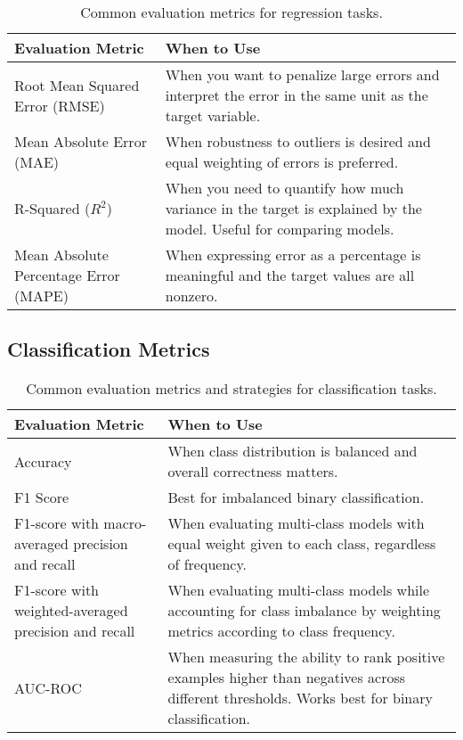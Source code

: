 \documentclass[12pt,openany, draft]{book}
\begin{document}
\begin{table}[H]
    \centering
    \small
    \renewcommand{\arraystretch}{1.3}
    \begin{tabular}{|l|p{9cm}|}
        \hline
        \textbf{Evaluation Metric} & \textbf{When to Use} \\
        \hline
        Root Mean Squared Error (RMSE) & When you want to penalize large errors and interpret the error in the same unit as the target variable. \\
        \hline
        Mean Absolute Error (MAE) & When robustness to outliers is desired and equal weighting of errors is preferred. \\
        \hline
        R-Squared (\( R^2 \)) & When you need to quantify how much variance in the target is explained by the model. Useful for comparing models. \\
        \hline
        Mean Absolute Percentage Error (MAPE) & When expressing error as a percentage is meaningful and the target values are all nonzero. \\
        \hline
    \end{tabular}
    \caption{Common evaluation metrics for regression tasks.}
\end{table}

\subsection{Classification Metrics}

\begin{table}[H]
    \centering
    \small
    \renewcommand{\arraystretch}{1.3}
    \begin{tabular}{|l|p{9cm}|}
        \hline
        \textbf{Evaluation Metric} & \textbf{When to Use} \\
        \hline
        Accuracy & When class distribution is balanced and overall correctness matters. \\
        \hline
        F1 Score & Best for 
        imbalanced binary classification. \\
        \hline
        F1-score with macro-averaged precision and recall & When evaluating multi-class models with equal weight 
        given to each class, regardless of frequency. \\
        \hline
        F1-score with weighted-averaged precision and recall & When evaluating multi-class models while accounting 
        for class imbalance by weighting metrics according to class frequency. \\
        \hline
        AUC-ROC & When measuring the ability to rank positive examples higher than 
        negatives across different thresholds. Works best for binary classification. \\
        \hline
    \end{tabular}
    \caption{Common evaluation metrics and strategies for classification tasks.}
\end{table}
\end{document}
